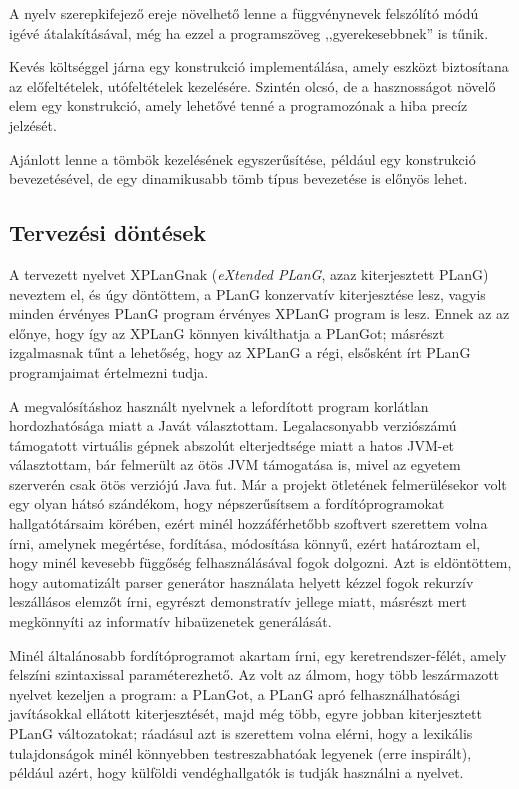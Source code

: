 A nyelv szerepkifejező ereje növelhető lenne a függvénynevek felszólító módú igévé átalakításával, még ha ezzel a programszöveg ,,gyerekesebbnek'' is tűnik.

Kevés költséggel járna egy  konstrukció implementálása, amely eszközt biztosítana az előfeltételek, utófeltételek kezelésére.
Szintén olcsó, de a hasznosságot növelő elem egy  konstrukció, amely lehetővé tenné a programozónak a hiba precíz jelzését.

Ajánlott lenne a tömbök kezelésének egyszerűsítése, például egy  konstrukció bevezetésével, de egy dinamikusabb tömb típus bevezetése is előnyös lehet.


\subsection{Tervezési döntések}\label{subsec:plans}
A tervezett nyelvet XPLanGnak (\textit{eXtended PLanG}, azaz kiterjesztett PLanG) neveztem el, és úgy döntöttem, a PLanG konzervatív kiterjesztése lesz, vagyis minden érvényes PLanG program érvényes XPLanG program is lesz.
Ennek az az előnye, hogy így az XPLanG könnyen kiválthatja a PLanGot; másrészt izgalmasnak tűnt a lehetőség, hogy az XPLanG a régi, elsősként írt PLanG programjaimat értelmezni tudja.

A megvalósításhoz használt nyelvnek a lefordított program korlátlan hordozhatósága miatt a Javát választottam.
Legalacsonyabb verziószámú támogatott virtuális gépnek abszolút elterjedtsége miatt a hatos JVM-et választottam, bár felmerült az ötös JVM támogatása is, mivel az egyetem  szerverén csak ötös verziójú Java fut.
Már a projekt ötletének felmerülésekor volt egy olyan hátsó szándékom, hogy népszerűsítsem a fordítóprogramokat hallgatótársaim körében, ezért minél hozzáférhetőbb szoftvert szerettem volna írni, amelynek megértése, fordítása, módosítása könnyű, ezért határoztam el, hogy minél kevesebb függőség felhasználásával fogok dolgozni.
Azt is eldöntöttem, hogy automatizált parser generátor használata helyett kézzel fogok rekurzív leszállásos elemzőt írni, egyrészt demonstratív jellege miatt, másrészt mert megkönnyíti az informatív hibaüzenetek generálását.

Minél általánosabb fordítóprogramot akartam írni, egy  keretrendszer-félét, amely felszíni szintaxissal paraméterezhető.
Az volt az álmom, hogy több leszármazott nyelvet kezeljen a program: a PLanGot, a PLanG apró felhasználhatósági javításokkal ellátott kiterjesztését, majd még több, egyre jobban kiterjesztett PLanG változatokat; ráadásul azt is szerettem volna elérni, hogy a lexikális tulajdonságok minél könnyebben testreszabhatóak legyenek (erre \cite{Balogh12} inspirált), például azért, hogy külföldi vendéghallgatók is tudják használni a nyelvet.

